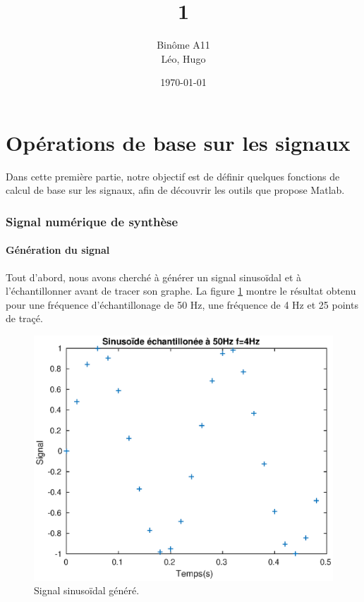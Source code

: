 \documentclass[french]{article}
\title{\bsc{SIG} 1}
\author{Binôme A11 \\ \bsc{Simon} Léo, \bsc{Levy--Falk} Hugo}
\date{\today}
\begin{document}
\maketitle
\tableofcontents
\clearpage
\listoffigures
\newpage
{}

\part{Opérations de base sur les signaux}

Dans cette première partie, notre objectif est de définir quelques fonctions de calcul de base sur les signaux, afin de découvrir les outils que propose Matlab.

\section{Signal numérique de synthèse}

\subsection{Génération du signal}

Tout d'abord, nous avons cherché à générer un signal sinusoïdal et à l'échantillonner avant de tracer son graphe. La figure \ref{signalSin} montre le résultat obtenu pour une fréquence d'échantillonage de 50 Hz, une fréquence de 4 Hz et 25 points de traçé.

\begin{figure}[h!]
\centering
\includegraphics{images/signalSinus.eps}
\caption{Signal sinusoïdal généré.}
\label{signalSin}
\end{figure}
\end{document}
